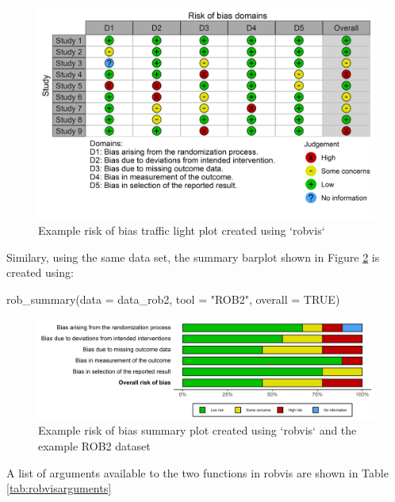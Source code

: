 \documentclass[a4paper, twoside]{templates/ociamthesis}
\newenvironment{Shaded}{\begin{snugshade}}{\end{snugshade}}
\newcommand{\AttributeTok}[1]{\textcolor[rgb]{0.77,0.63,0.00}{#1}}
\newcommand{\ConstantTok}[1]{\textcolor[rgb]{0.00,0.00,0.00}{#1}}
\newcommand{\FunctionTok}[1]{\textcolor[rgb]{0.00,0.00,0.00}{#1}}
\newcommand{\NormalTok}[1]{#1}
\newcommand{\StringTok}[1]{\textcolor[rgb]{0.31,0.60,0.02}{#1}}
\renewenvironment{Shaded}
{
  \vspace{4pt}%
  \begin{snugshade}%
}{%
  \end{snugshade}%
  \vspace{4pt}%
}
\begin{document}
\begin{figure}
\includegraphics[width=1\linewidth]{figures/sys-rev-tools/example-rob-traffic-light-plot} \caption{Example risk of bias traffic light plot created using `robvis`}\label{fig:trafficplot}
\end{figure}

Similary, using the same data set, the summary barplot shown in Figure \ref{fig:summaryplot} is created using:

\begin{Shaded}
\begin{Highlighting}[]
\FunctionTok{rob\_summary}\NormalTok{(}\AttributeTok{data =}\NormalTok{ data\_rob2,}
            \AttributeTok{tool =} \StringTok{"ROB2"}\NormalTok{, }
            \AttributeTok{overall =} \ConstantTok{TRUE}\NormalTok{)}
\end{Highlighting}
\end{Shaded}

\begin{figure}
\includegraphics[width=1\linewidth]{figures/sys-rev-tools/example-rob-summary-barplot} \caption{Example risk of bias summary plot created using `robvis` and the example ROB2 dataset}\label{fig:summaryplot}
\end{figure}

A list of arguments available to the two functions in robvis are shown in Table \ref{tab:robvisarguments}
\end{document}
